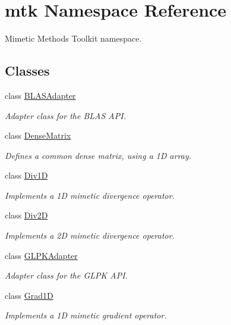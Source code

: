 \hypertarget{namespacemtk}{\section{mtk Namespace Reference}
\label{namespacemtk}
}


Mimetic Methods Toolkit namespace.  


\subsection*{Classes}
\begin{DoxyCompactItemize}
\item 
class \hyperlink{classmtk_1_1BLASAdapter}{B\+L\+A\+S\+Adapter}
\begin{DoxyCompactList}\small\item\em Adapter class for the B\+L\+A\+S A\+P\+I. \end{DoxyCompactList}\item 
class \hyperlink{classmtk_1_1DenseMatrix}{Dense\+Matrix}
\begin{DoxyCompactList}\small\item\em Defines a common dense matrix, using a 1\+D array. \end{DoxyCompactList}\item 
class \hyperlink{classmtk_1_1Div1D}{Div1\+D}
\begin{DoxyCompactList}\small\item\em Implements a 1\+D mimetic divergence operator. \end{DoxyCompactList}\item 
class \hyperlink{classmtk_1_1Div2D}{Div2\+D}
\begin{DoxyCompactList}\small\item\em Implements a 2\+D mimetic divergence operator. \end{DoxyCompactList}\item 
class \hyperlink{classmtk_1_1GLPKAdapter}{G\+L\+P\+K\+Adapter}
\begin{DoxyCompactList}\small\item\em Adapter class for the G\+L\+P\+K A\+P\+I. \end{DoxyCompactList}\item 
class \hyperlink{classmtk_1_1Grad1D}{Grad1\+D}
\begin{DoxyCompactList}\small\item\em Implements a 1\+D mimetic gradient operator. \end{DoxyCompactList}\item 

\end{DoxyCompactItemize}
